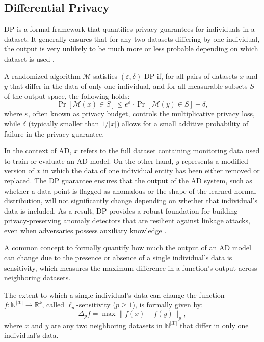 \subsection{Differential Privacy} \label{s:background_dp}

DP is a formal framework that quantifies privacy guarantees for individuals in a dataset. It generally ensures that for any two datasets differing by one individual, the output is very unlikely to be much more or less probable depending on which dataset is used \citep{dwork2014algorithmic}.

\begin{definition}
A randomized algorithm $\mathcal{M}$ satisfies $(\varepsilon, \delta)$-DP if, for all pairs of datasets $x$ and $y$ that differ in the data of only one individual, and for all measurable subsets $S$ of the output space, the following holds:
\[
\Pr[\mathcal{M}(x) \in S] \leq e^{\varepsilon} \cdot \Pr[\mathcal{M}(y) \in S] + \delta,
\]
where $\varepsilon$, often known as privacy budget, controls the multiplicative privacy loss, while $\delta$ (typically smaller than $1/|x|$) allows for a small additive probability of failure in the privacy guarantee.
\end{definition}

In the context of AD, $x$ refers to the full dataset containing monitoring data used to train or evaluate an AD model. On the other hand, $y$ represents a modified version of $x$ in which the data of one individual entity has been either removed or replaced. The DP guarantee ensures that the output of the AD system, such as whether a data point is flagged as anomalous or the shape of the learned normal distribution, will not significantly change depending on whether that individual’s data is included. As a result, DP provides a robust foundation for building privacy-preserving anomaly detectors that are resilient against linkage attacks, even when adversaries possess auxiliary knowledge \citep[pg.~22]{dwork2014algorithmic}.

A common concept to formally quantify how much the output of an AD model can change due to the presence or absence of a single individual’s data is sensitivity, which measures the maximum difference in a function’s output across neighboring datasets.

\begin{definition}\label{def:sensitivity}
The extent to which a single individual’s data can change the function $f : \mathbb{N}^{|\mathcal{X}|} \rightarrow \mathbb{R}^k$, called $\ell_p$-sensitivity ($p \geq 1$), is formally given by:
\[
\Delta_p f = \max \|f(x) - f(y)\|_p,
\]
where $x$ and $y$ are any two neighboring datasets in $\mathbb{N}^{|\mathcal{X}|}$ that differ in only one individual’s data.
\end{definition}

